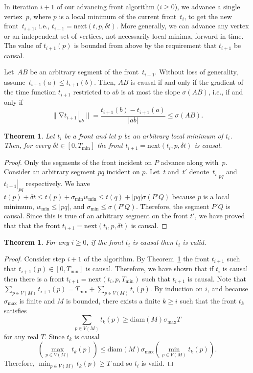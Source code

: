 \documentclass[twocolumn]{article}
\def\minW{\ensuremath{w_{\text{min}}}}
\def\S{\ensuremath{\sigma}}
\def\minS{\ensuremath{\S_{\text{min}}}}
\def\maxS{\ensuremath{\S_{\text{max}}}}
\def\minT{\ensuremath{T_{\text{min}}}}
\def\sp{\ensuremath{M}}
\def\diam{\text{diam}}
\def\fp{\ensuremath{P}}
\def\fq{\ensuremath{Q}}
\def\a{\ensuremath{a}}
\def\b{\ensuremath{b}}
\def\fa{\ensuremath{A}}
\def\fb{\ensuremath{B}}
\DeclareMathOperator{\grad}{\ensuremath{\nabla}}
\def\abs#1{\ensuremath{\mathopen| #1 \mathclose|}}
\def\norm#1{\ensuremath{\mathopen\| #1 \mathclose\|}}
\def\dt{\ensuremath{\delta t}}
\def\rest#1#2{\ensuremath{\left. #1 \right|_{#2}}}
\def\next{\text{next}}
\newtheorem{theorem}[lemma]{Theorem}
\begin{document}
In iteration $i+1$ of our advancing front algorithm ($i \ge 0$), we
advance a single vertex~$p$, where $p$ is a local minimum of the
current front~$t_i$, to get the new front~$t_{i+1}$, i.e., $t_{i+1} =
\next(t,p,\dt)$.  More generally, we can advance any vertex or an
independent set of vertices, not necessarily local minima, forward in
time.  The value of $t_{i+1}(p)$ is bounded from above by the
requirement that $t_{i+1}$ be causal.

Let~$\fa\fb$ be an arbitrary segment of the front~$t_{i+1}$. Without
loss of generality, assume~$t_{i+1}(\a) \le t_{i+1}(\b)$.  Then,
$\fa\fb$ is causal if and only if the gradient of the time function
$t_{i+1}$ restricted to $ab$ is at most the slope $\S(\fa\fb)$, i.e.,
if and only if
  \begin{equation}\boxed{\norm{\grad \rest{t_{i+1}}{ab}}
  =
    \frac{t_{i+1}(b) - t_{i+1}(a)}{\abs{ab}}
  \le
    \S(\fa\fb).
  \label{eqn:1d:causalityconstraint}
  }\end{equation}

\begin{theorem}
  Let $t_i$ be a front and let $p$ be an
  arbitrary local minimum of $t_i$.  Then, for every $\dt \in [0,\minT]$
  the front $t_{i+1} = \next(t_i,p,\dt)$ is causal.
\label{thm:1d:causal}
\end{theorem}
\begin{proof}
  Only the segments of the front incident on $\fp$ advance along
  with~$p$.  Consider an arbitrary segment $pq$ incident on $p$.
  Let~$t$ and~$t'$ denote~$\rest{t_i}{pq}$ and~$\rest{t_{i+1}}{pq}$
  respectively.  We have $t(p) + \dt \le t(p) + \minS \minW \le t(q) +
  \abs{pq} \S(\fp'\fq)$ because $p$ is a local minimum, $\minW \le
  \abs{pq}$, and $\minS \le \S(\fp'\fq)$.  Therefore, the segment
  $\fp'\fq$ is causal.  Since this is true of an arbitrary segment on
  the front $t'$, we have proved that that the front $t_{i+1} =
  \next(t_i,p,\dt)$ is causal.
\end{proof}



\begin{theorem}
  For any $i \ge 0$, if the front $t_i$ is causal then $t_i$ is
  valid.
\label{thm:1d:causalisvalid}
\end{theorem}
\begin{proof}
  Consider step $i+1$ of the algorithm.  By
  Theorem~\ref{thm:1d:causal} the front $t_{i+1}$ such that
  $t_{i+1}(p) \in [0,\minT]$ is causal.  Therefore, we have shown that
  if $t_i$ is causal then there is a front $t_{i+1} =
  \next(t_i,p,\minT)$ such that $t_{i+1}$ is causal.  Note that
  $\sum_{p \in V(\sp)} t_{i+1}(p) = \minT + \sum_{p \in V(\sp)}
  t_i(p)$.  By induction on $i$, and because $\maxS$ is finite and
  $\sp$ is bounded, there exists a finite $k \ge i$ such that the
  front $t_k$ satisfies
  \[
    \sum_{p \in V(\sp)} t_k(p)
  \ge
   \diam(\sp) \maxS T
  \]
  for any real $T$.  Since $t_k$ is causal
  \[
    \left( \max_{p \in V(\sp)} t_k(p) \right)
  \le
    \diam(\sp) \maxS \left( \min_{p \in V(\sp)} t_k(p) \right).
  \]
  Therefore, $\min_{p \in V(\sp)} t_k(p) \ge T$ and so $t_i$ is valid.
\end{proof}
\end{document}
